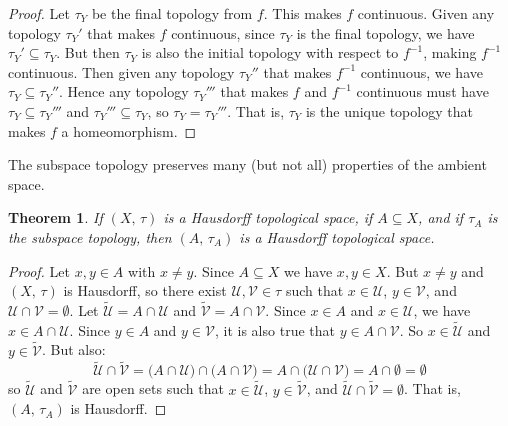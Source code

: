 \documentclass{article}
\theoremstyle{plain}
\newtheorem{theorem}{Theorem}[section]
\theoremstyle{normal}
\begin{document}
        \begin{proof}
            Let $\tau_{Y}$ be the final topology from $f$. This makes $f$
            continuous. Given any topology $\tau_{Y}'$ that makes $f$
            continuous, since $\tau_{Y}$ is the final topology, we have
            $\tau_{Y}'\subseteq\tau_{Y}$. But then $\tau_{Y}$ is also the
            initial topology with respect to $f^{-1}$, making $f^{-1}$
            continuous. Then given any topology $\tau_{Y}''$ that makes
            $f^{-1}$ continuous, we have $\tau_{Y}\subseteq\tau_{Y}''$. Hence
            any topology $\tau_{Y}'''$ that makes $f$ and $f^{-1}$ continuous
            must have $\tau_{Y}\subseteq\tau_{Y}'''$ and
            $\tau_{Y}'''\subseteq\tau_{Y}$, so $\tau_{Y}=\tau_{Y}'''$. That is,
            $\tau_{Y}$ is the unique topology that makes $f$ a homeomorphism.
        \end{proof}
        The subspace topology preserves many (but not all) properties of the
        ambient space.
        \begin{theorem}
            If $(X,\,\tau)$ is a Hausdorff topological space, if
            $A\subseteq{X}$, and if $\tau_{A}$ is the subspace topology, then
            $(A,\,\tau_{A})$ is a Hausdorff topological space.
        \end{theorem}
        \begin{proof}
            Let $x,y\in{A}$ with $x\ne{y}$. Since $A\subseteq{X}$ we have
            $x,y\in{X}$. But $x\ne{y}$ and $(X,\,\tau)$ is Hausdorff, so there
            exist $\mathcal{U},\mathcal{V}\in\tau$ such that $x\in\mathcal{U}$,
            $y\in\mathcal{V}$, and $\mathcal{U}\cap\mathcal{V}=\emptyset$.
            Let $\tilde{\mathcal{U}}=A\cap\mathcal{U}$ and
            $\tilde{\mathcal{V}}=A\cap\mathcal{V}$. Since $x\in{A}$ and
            $x\in\mathcal{U}$, we have $x\in{A}\cap\mathcal{U}$. Since
            $y\in{A}$ and $y\in\mathcal{V}$, it is also true that
            $y\in{A}\cap\mathcal{V}$. So $x\in\tilde{\mathcal{U}}$ and
            $y\in\tilde{\mathcal{V}}$. But also:
            \begin{equation}
                \tilde{\mathcal{U}}\cap\tilde{\mathcal{V}}
                =\big(A\cap\mathcal{U}\big)\cap\big(A\cap\mathcal{V}\big)
                =A\cap\big(\mathcal{U}\cap\mathcal{V}\big)
                =A\cap\emptyset
                =\emptyset
            \end{equation}
            so $\tilde{\mathcal{U}}$ and $\tilde{\mathcal{V}}$ are open sets
            such that $x\in\tilde{\mathcal{U}}$, $y\in\tilde{\mathcal{V}}$, and
            $\tilde{\mathcal{U}}\cap\tilde{\mathcal{V}}=\emptyset$. That is,
            $(A,\,\tau_{A})$ is Hausdorff.
        \end{proof}
\end{document}
